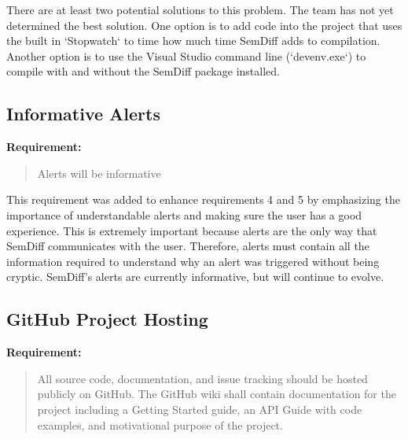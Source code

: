 \documentclass[draftclsnofoot,onecolumn]{IEEEtran}
\begin{document}
There are at least two potential solutions to this problem. The team has not 
yet determined the best solution. One option is to add code into the project 
that uses the built in `Stopwatch` to time how much time SemDiff adds to 
compilation. Another option is to use the Visual Studio command line 
(`devenv.exe`) to compile with and without the SemDiff package installed.

\subsection{Informative Alerts}%

\textbf{Requirement:}

\begin{quote}

Alerts will be informative

\end{quote}

This requirement was added to enhance requirements 4 and 5 by emphasizing the 
importance of understandable alerts and making sure the user has a good 
experience. This is extremely important because alerts are the only way that 
SemDiff communicates with the user. Therefore, alerts must contain all the 
information required to understand why an alert was triggered without being 
cryptic. SemDiff’s alerts are currently informative, but will continue to 
evolve.

\subsection{GitHub Project Hosting}%

\textbf{Requirement:}

\begin{quote}

All source code, documentation, and issue tracking should be hosted publicly 
on GitHub. The GitHub wiki shall contain documentation for the project 
including a Getting Started guide, an API Guide with code examples, and 
motivational purpose of the project.

\end{quote}
\end{document}

